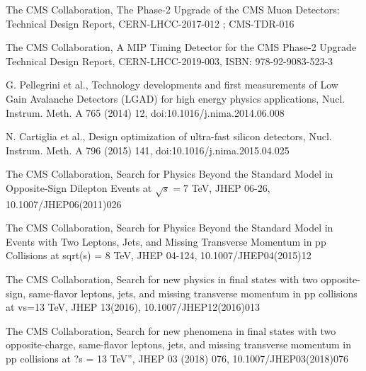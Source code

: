\begin{thebibliography}{20}
  {The CMS Collaboration, The Phase-2 Upgrade of the CMS Muon Detectors:
Technical Design Report, CERN-LHCC-2017-012 ; CMS-TDR-016}

  {The CMS Collaboration, A MIP Timing Detector for the CMS Phase-2 Upgrade Technical Design Report, CERN-LHCC-2019-003, ISBN: 978-92-9083-523-3} 
 
  {G. Pellegrini et al., Technology developments and first measurements of Low Gain Avalanche Detectors (LGAD) for high energy physics applications, Nucl. Instrum. Meth. A 765 (2014) 12, doi:10.1016/j.nima.2014.06.008}
  
  {N. Cartiglia et al., Design optimization of ultra-fast silicon detectors, Nucl. Instrum. Meth. A 796 (2015) 141, doi:10.1016/j.nima.2015.04.025}
  
  {The CMS Collaboration, Search for Physics Beyond the Standard Model in Opposite-Sign Dilepton Events at $\sqrt{s} = 7$ TeV, JHEP 06-26, 10.1007/JHEP06(2011)026}

  {}

  {}
  
  {The CMS Collaboration, Search for Physics Beyond the Standard Model in Events with Two Leptons, Jets, and Missing Transverse Momentum in pp Collisions at sqrt(s) = 8 TeV, JHEP 04-124, 10.1007/JHEP04(2015)12}
  
  {The CMS Collaboration, Search for new physics in final states with two opposite-sign, same-flavor leptons, jets, and missing transverse momentum in pp collisions at vs=13 TeV, JHEP 13(2016), 10.1007/JHEP12(2016)013}
  
  {The CMS Collaboration, Search for new phenomena in final states with two opposite-charge, same-flavor leptons, jets, and missing transverse momentum in pp collisions at ?s = 13 TeV”, JHEP 03 (2018) 076, 10.1007/JHEP03(2018)076}
  
  {}
  

\end{thebibliography}
